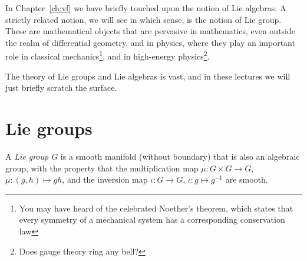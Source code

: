In Chapter~\ref{ch:vf} we have briefly touched upon the notion of Lie algebras.
A strictly related notion, we will see in which sense, is the notion of Lie group.
These are mathematical objects that are pervasive in mathematics, even outside the realm of differential geometry, and in physics, where they play an important role in classical mechanics\footnote{You may have heard of the celebrated Noether's theorem, which states that every symmetry of a mechanical system has a corresponding conservation law}, and in high-energy physics\footnote{Does gauge theory ring any bell?}.

The theory of Lie groups and Lie algebras is vast, and in these lectures we will just briefly scratch the surface.

\section{Lie groups}

\begin{definition}
	A \emph{Lie group $G$} is a smooth manifold (without boundary) that is also an algebraic group, with the property that the multiplication map $\mu: G\times G \to G$, $\mu:(g,h)\mapsto gh$, and the inversion map $\iota:G\to G$, $\iota: g\mapsto g^{-1}$ are smooth.
\end{definition}

